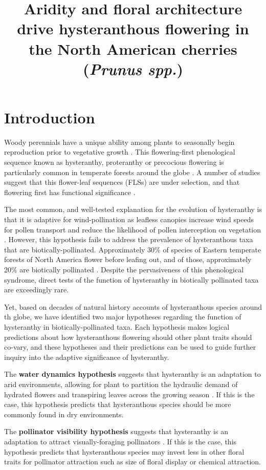 \documentclass{article}\usepackage[]{graphicx}\usepackage[]{color}
\title{Aridity and floral architecture drive hysteranthous flowering in the North American cherries (\textit{Prunus spp.})}
\begin{document}
\maketitle


\section*{Introduction}
\noindent Woody perennials have a unique ability among plants to seasonally begin reproduction prior to vegetative growth \citep{}. This flowering-first phenological sequence known as hysteranthy, proteranthy or precocious flowering is particularly common in temperate forests around the globe \citep{}. A number of studies suggest that this flower-leaf sequences (FLSs) are under selection, and that flowering first has functional significance \citep{}.

\noindent The most common, and well-tested explanation for the evolution of hysteranthy is that it is adaptive for wind-pollination as leafless canopies increase wind speeds for pollen transport and reduce the likelihood of pollen interception on vegetation \citep{}. However, this hypothesis fails to address the prevalence of hysteranthous taxa that are biotically-pollinated. Approximately 30\% of species of Eastern temperate forests of North America flower before leafing out, and of those, approximately 20\% are biotically pollinated  \citep{}. Despite the pervasiveness of this phenological syndrome, direct tests of the function of hysteranthy in biotically pollinated taxa are exceedingly rare.

\noindent Yet, based on decades of natural history accounts of hysteranthous species around th globe, we have identified two major hypotheses regarding the function of hysteranthy in biotically-pollinated taxa. Each hypothesis makes logical predictions about how hysteranthous flowering should other plant traits should co-vary, and these hypotheses and their predictions can be used to guide further inquiry into the adaptive significance of hysteranthy.

The \textbf{water dynamics hypothesis} suggests that hysteranthy is an adaptation to arid environments, allowing for plant to partition the hydraulic demand of hydrated flowers and transpiring leaves across the growing season \citep{}. If this is the case, this hypothesis predicts that hysteranthous species should be more commonly found in dry environments.  

The \textbf{pollinator visibility hypothesis} suggests that hysteranthy is an adaptation to attract visually-foraging pollinators \citep{}. If this is the case, this hypothesis predicts that hysteranthous species may invest less in other floral traits for pollinator attraction such as size of floral display or chemical attraction. 
\end{document}
